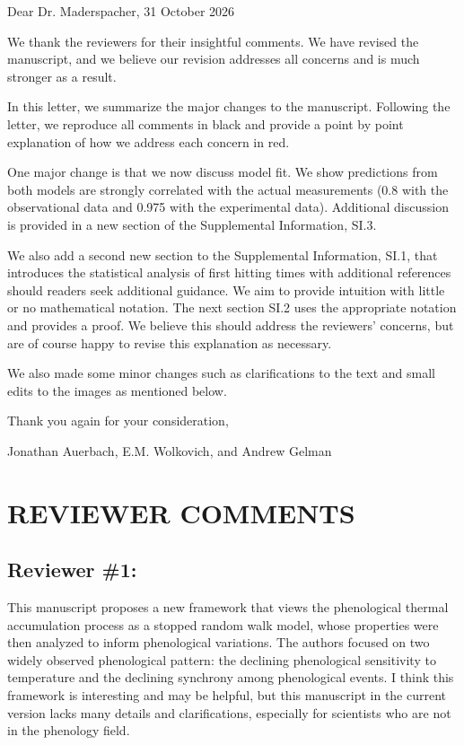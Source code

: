 \documentclass{article}
\begin{document}
\thispagestyle{empty}
Dear Dr. Maderspacher, \hfill 31 October 2026   \newline \vspace{-.75em}

We thank the reviewers for their insightful comments. We have revised the manuscript, and we believe our revision addresses all concerns and is much stronger as a result.

In this letter, we summarize the major changes to the manuscript. Following the letter, we reproduce all comments in black and provide a point by point explanation of how we address each concern in red.

One major change is that we now discuss model fit. We show predictions from both models are strongly correlated with the actual measurements (0.8 with the observational data and 0.975 with the experimental data). Additional discussion is provided in a new section of the Supplemental Information, SI.3. 

We also add a second new section to the Supplemental Information, SI.1, that introduces the statistical analysis of first hitting times with additional references should readers seek additional guidance. We aim to provide intuition with little or no mathematical notation. The next section SI.2 uses the appropriate notation and provides a proof. We believe this should address the reviewers' concerns, but are of course happy to revise this explanation as necessary. 

We also made some minor changes such as clarifications to the text and small edits to the images as mentioned below.

Thank you again for your consideration,

Jonathan Auerbach, E.M. Wolkovich, and Andrew Gelman


\section{REVIEWER COMMENTS}

\subsection{Reviewer \#1: } This manuscript proposes a new framework that views the phenological thermal accumulation process as a stopped random walk model, whose properties were then analyzed to inform phenological variations. The authors focused on two widely observed phenological pattern: the declining phenological sensitivity to temperature and the declining synchrony among phenological events. I think this framework is interesting and may be helpful, but this manuscript in the current version lacks many details and clarifications, especially for scientists who are not in the phenology field.
\end{document}
